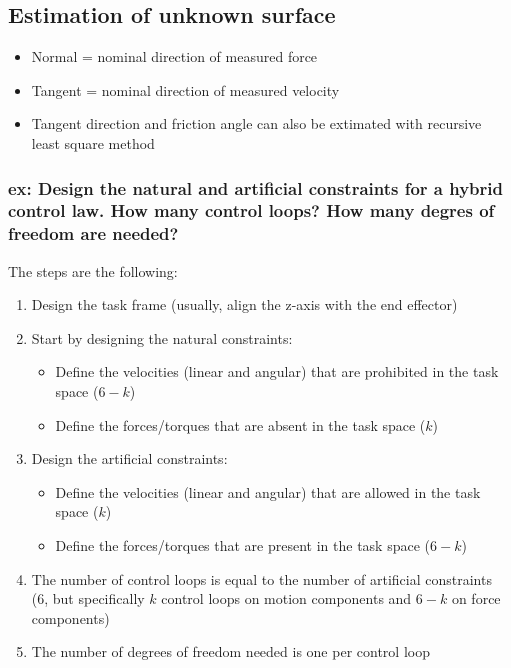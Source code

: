 \documentclass[a4paper,12pt]{article}
\begin{document}
\subsection{Estimation of unknown surface}
\begin{itemize}
    \item Normal = nominal direction of measured force
    \item Tangent = nominal direction of measured velocity
    \item Tangent direction and friction angle can also be extimated with 
    recursive least square method
\end{itemize}

\subsubsection{ex: Design the natural and 
artificial constraints for a hybrid control law. How many control loops? How many degres of freedom are needed?}
The steps are the following:
\begin{enumerate}
\item Design the task frame (usually, align the z-axis with the end effector)
\item Start by designing the natural constraints: \begin{itemize}
    \item Define the velocities (linear and angular) that are
        prohibited in the task space ($6-k$)
    \item Define the forces/torques that are absent
     in the task space ($k$)
\end{itemize}
\item Design the artificial constraints: \begin{itemize}
    \item Define the velocities (linear and angular) that are
        allowed in the task space ($k$)
    \item Define the forces/torques that are present
     in the task space ($6-k$)
\end{itemize}
\item The number of control loops is equal to the number of
artificial constraints (6, but specifically $k$ 
control loops on motion components and $6-k$ on force components)
\item The number of degrees of freedom needed is one per 
control loop
\end{enumerate}
\end{document}
